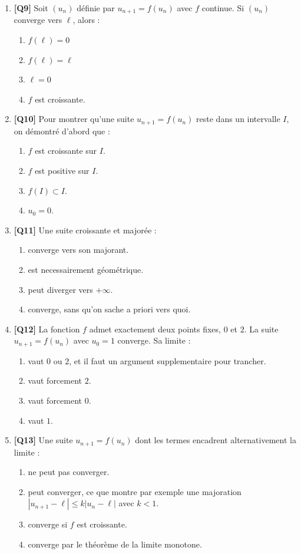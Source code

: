 \begin{enumerate}
\item \textbf{[Q9]} Soit $(u_n)$ définie par $u_{n+1} = f(u_n)$ avec $f$ continue. Si $(u_n)$ converge vers $\ell$, alors :
  \begin{enumerate}[label=\Alph*.]
    \item $f(\ell) = 0$
    \item $f(\ell) = \ell$
    \item $\ell = 0$
    \item $f$ est croissante.
  \end{enumerate}

\item \textbf{[Q10]} Pour montrer qu'une suite $u_{n+1} = f(u_n)$ reste dans un intervalle $I$, on démontré d'abord que :
  \begin{enumerate}[label=\Alph*.]
    \item $f$ est croissante sur $I$.
    \item $f$ est positive sur $I$.
    \item $f(I) \subset I$.
    \item $u_0 = 0$.
  \end{enumerate}

\item \textbf{[Q11]} Une suite croissante et majorée :
  \begin{enumerate}[label=\Alph*.]
    \item converge vers son majorant.
    \item est necessairement géométrique.
    \item peut diverger vers $+\infty$.
    \item converge, sans qu'on sache a priori vers quoi.
  \end{enumerate}

\item \textbf{[Q12]} La fonction $f$ admet exactement deux points fixes, $0$ et $2$. La suite $u_{n+1} = f(u_n)$ avec $u_0 = 1$ converge. Sa limite :
  \begin{enumerate}[label=\Alph*.]
    \item vaut $0$ ou $2$, et il faut un argument supplementaire pour trancher.
    \item vaut forcement $2$.
    \item vaut forcement $0$.
    \item vaut $1$.
  \end{enumerate}

\item \textbf{[Q13]} Une suite $u_{n+1} = f(u_n)$ dont les termes encadrent alternativement la limite :
  \begin{enumerate}[label=\Alph*.]
    \item ne peut pas converger.
    \item peut converger, ce que montre par exemple une majoration $\left|u_{n+1} - \ell\right| \leq k\left|u_n - \ell\right|$ avec $k < 1$.
    \item converge si $f$ est croissante.
    \item converge par le théorème de la limite monotone.
  \end{enumerate}


\end{enumerate}
